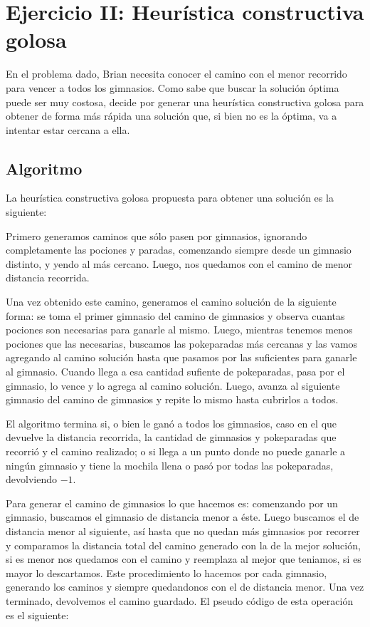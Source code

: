 \section{Ejercicio II: Heurística constructiva golosa}

En el problema dado, Brian necesita conocer el camino con el menor recorrido para vencer a todos los gimnasios. Como sabe que buscar la solución óptima puede ser muy costosa, decide por generar una heurística constructiva golosa para obtener de forma más rápida una solución que, si bien no es la óptima, va a intentar estar cercana a ella.

\subsection{Algoritmo}

La heurística constructiva golosa propuesta para obtener una solución es la siguiente:

Primero generamos caminos que sólo pasen por gimnasios, ignorando completamente las pociones y paradas, comenzando siempre desde un gimnasio distinto, y yendo al más cercano. Luego, nos quedamos con el camino de menor distancia recorrida. 

Una vez obtenido este camino, generamos el camino solución de la siguiente forma: se toma el primer gimnasio del camino de gimnasios y observa cuantas pociones son necesarias para ganarle al mismo. Luego, mientras tenemos menos pociones que las necesarias, buscamos las pokeparadas más cercanas y las vamos agregando al camino solución hasta que pasamos por las suficientes para ganarle al gimnasio. Cuando llega a esa cantidad sufiente de pokeparadas, pasa por el gimnasio, lo vence y lo agrega al camino solución. Luego, avanza al siguiente gimnasio del camino de gimnasios y repite lo mismo hasta cubrirlos a todos.

El algoritmo termina si, o bien le ganó a todos los gimnasios, caso en el que devuelve la distancia recorrida, la cantidad de gimnasios y pokeparadas que recorrió y el camino realizado; o si llega a un punto donde no puede ganarle a ningún gimnasio y tiene la mochila llena o pasó por todas las pokeparadas, devolviendo $-1$.


Para generar el camino de gimnasios lo que hacemos es: comenzando por un gimnasio, buscamos el gimnasio de distancia menor a éste. Luego buscamos el de distancia menor al siguiente, así hasta que no quedan más gimnasios por recorrer y comparamos la distancia total del camino generado con la de la mejor solución, si es menor nos quedamos con el camino y reemplaza al mejor que teniamos, si es mayor lo descartamos. Este procedimiento lo hacemos por cada gimnasio, generando los caminos y siempre quedandonos con el de distancia menor. Una vez terminado, devolvemos el camino guardado. El pseudo código de esta operación es el siguiente:

